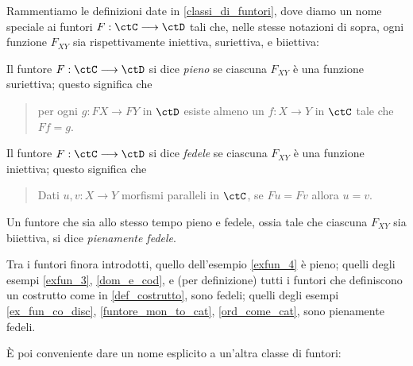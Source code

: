 Rammentiamo le definizioni date in \ref{classi_di_funtori}, dove diamo un nome speciale ai funtori \(F : \ctC\fun\ctD\) tali che, nelle stesse notazioni di sopra, ogni funzione \(F_{XY}\) sia rispettivamente iniettiva, suriettiva, e biiettiva:
\begin{definition}\label{funtore_pieno}
	Il funtore \(F : \ctC\fun\ctD\) si dice \emph{pieno} se ciascuna \(F_{XY}\) è una funzione suriettiva; questo significa che
	\begin{quote}
		per ogni \(g : FX\to FY\) in \(\ctD\) esiste almeno un \(f : X\to Y\) in \(\ctC\) tale che \(Ff=g\).
	\end{quote}
\end{definition}
\begin{definition}\label{funtore_fedele}
	Il funtore \(F : \ctC\fun\ctD\) si dice \emph{fedele} se ciascuna \(F_{XY}\) è una funzione iniettiva; questo significa che
	\begin{quote}
		Dati \(u,v : X\to Y\) morfismi paralleli in \(\ctC\), se \(Fu=Fv\) allora \(u=v\).
	\end{quote}
\end{definition}
\begin{notation}\label{fun_pienfed}
	Un funtore che sia allo stesso tempo pieno e fedele, ossia tale che ciascuna \(F_{XY}\) sia biiettiva, si dice \emph{pienamente fedele}.
\end{notation}
\begin{remark}
	Tra i funtori finora introdotti, quello dell'esempio \ref{exfun_4} è pieno; quelli degli esempi \ref{exfun_3}, \ref{dom_e_cod}, e (per definizione) tutti i funtori che definiscono un costrutto come in \ref{def_costrutto}, sono fedeli; quelli degli esempi \ref{ex_fun_co_disc}, \ref{funtore_mon_to_cat}, \ref{ord_come_cat}, sono pienamente fedeli.
\end{remark}
\`E poi conveniente dare un nome esplicito a un'altra classe di funtori:
